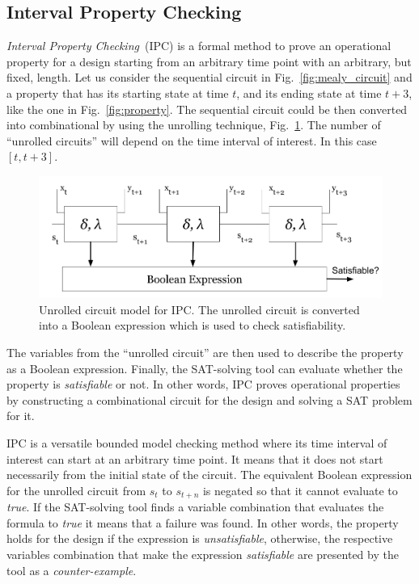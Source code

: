 \subsection{Interval Property Checking}
\label{subsection:ipc}

\textit{Interval Property Checking}~(IPC) is a formal method to prove an operational property for a design starting from an arbitrary time point with an arbitrary, but fixed, length. Let us consider the sequential circuit in Fig.~\ref{fig:mealy_circuit} and a property that has its starting state at time $t$, and its ending state at time $t+3$, like the one in Fig.~\ref{fig:property}. The sequential circuit could be then converted into combinational by using the unrolling technique, Fig.~\ref{fig:unrolled}. The number of “unrolled circuits” will depend on the time interval of interest. In this case $[t, t+3]$.

\begin{figure}[htb!]
	\centering
	\includegraphics[width=\textwidth]{images/unrolled_circuit.png}
	\caption{Unrolled circuit model for IPC. The unrolled circuit is converted into a Boolean expression which is used to check satisfiability.}
	\label{fig:unrolled}
\end{figure}

The variables from the “unrolled circuit” are then used to describe the property as a Boolean expression. Finally, the SAT-solving tool can evaluate whether the property is \textit{satisfiable} or not. In other words, IPC proves operational properties by constructing a combinational circuit for the design and solving a SAT problem for it. 

IPC is a versatile bounded model checking method where its time interval of interest can start at an arbitrary time point. It means that it does not start necessarily from the initial state of the circuit. The equivalent Boolean expression for the unrolled circuit from $s_t$ to $s_{t+n}$ is negated so that it cannot evaluate to \textit{true}. If the SAT-solving tool finds a variable combination that evaluates the formula to \textit{true} it means that a failure was found. In other words, the property holds for the design if the expression is \textit{unsatisfiable}, otherwise, the respective variables combination that make the expression \textit{satisfiable} are presented by the tool as a \textit{counter-example}.

